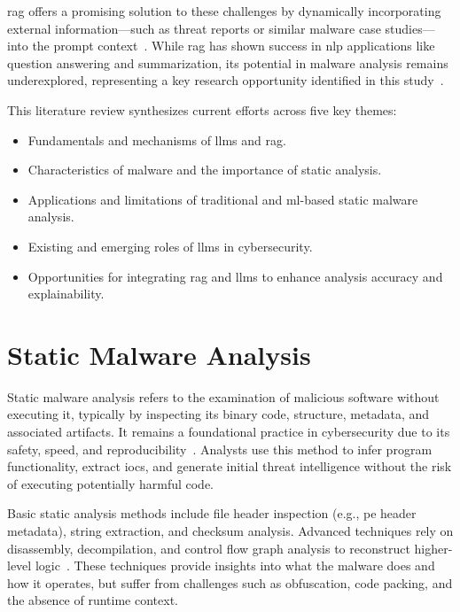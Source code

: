 \gls{rag} offers a promising solution to these challenges by dynamically incorporating external
information—such as threat reports or similar malware case studies—into the prompt context~\cite{gao2023retrieval}.
While \gls{rag} has shown success in \gls{nlp} applications like question answering
and summarization, its potential in malware analysis remains underexplored, representing a key
research opportunity identified in this study~\cite{lewis2020retrieval}.

This literature review synthesizes current efforts across five key themes:
\begin{itemize}
	\item Fundamentals and mechanisms of \glspl{llm} and \gls{rag}.
	\item Characteristics of malware and the importance of static analysis.
	\item Applications and limitations of traditional and \gls{ml}-based static malware analysis.
	\item Existing and emerging roles of \glspl{llm} in cybersecurity.
	\item Opportunities for integrating \gls{rag} and \glspl{llm} to enhance analysis accuracy and
	      explainability.
\end{itemize}

\section{Static Malware Analysis}\label{sec:StaticMalwareAnalysis}
Static malware analysis refers to the examination of malicious software without executing it,
typically by inspecting its binary code, structure, metadata, and associated artifacts. It remains
a foundational practice in cybersecurity due to its safety, speed, and
reproducibility~\cite{fedak2020fundamentals, gaber2024malware, cassanova2022systematic}. Analysts
use this method to infer program functionality, extract \glspl{ioc}, and generate initial threat
intelligence without the risk of executing potentially harmful code.

Basic static analysis methods include file header inspection (e.g., \gls{pe} header metadata),
string extraction, and checksum analysis. Advanced techniques rely on disassembly,
\gls{decompilation}, and control flow graph analysis to reconstruct higher-level
logic~\cite{fedak2020fundamentals, wong2021practice}. These techniques provide insights into what
the malware does and how it operates, but suffer from challenges such as obfuscation, code packing,
and the absence of runtime context.

